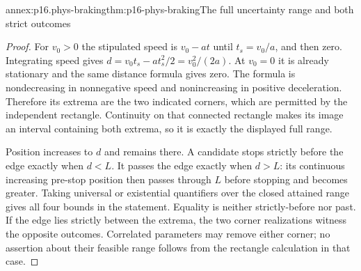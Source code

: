 \begin{annexitem}{annex:p16.phys-braking}{thm:p16-phys-braking}{The full uncertainty range and both strict outcomes}
\begin{proof}
For \(v_0>0\) the stipulated speed is \(v_0-at\) until
\(t_s=v_0/a\), and then zero. Integrating speed gives
\(d=v_0t_s-at_s^2/2=v_0^2/(2a)\). At \(v_0=0\) it is already
stationary and the same distance formula gives zero. The formula is
nondecreasing in nonnegative speed and nonincreasing in positive
deceleration. Therefore its extrema are the two indicated corners, which
are permitted by the independent rectangle. Continuity on that connected
rectangle makes its image an interval containing both extrema, so it is
exactly the displayed full range.

Position increases to \(d\) and remains there. A candidate stops
strictly before the edge exactly when \(d<L\). It passes the edge
exactly when \(d>L\): its continuous increasing pre-stop position
then passes through \(L\) before stopping and becomes greater.
Taking universal or existential quantifiers over the closed attained
range gives all four bounds in the statement. Equality is neither
strictly-before nor past. If the edge lies strictly between the extrema,
the two corner realizations witness the opposite outcomes. Correlated
parameters may remove either corner; no assertion about their feasible
range follows from the rectangle calculation in that case.
\end{proof}
\end{annexitem}
